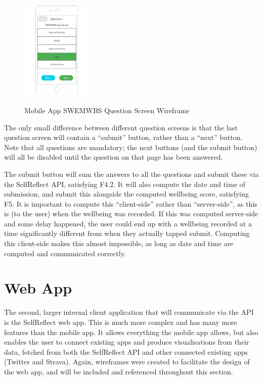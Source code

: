 \documentclass[11pt,openright,a4paper]{report}
\begin{document}
\begin{figure}[ht]
\centering
\caption{Mobile App SWEMWBS Question Screen Wireframe}
\includegraphics[width=0.3\textwidth]{i/mobilequestion.png}
\label{fig:mobilequestion}
\end{figure}

The only small difference between different question screens is that the last question screen will contain a \enquote{submit} button, rather than a \enquote{next} button. Note that all questions are mandatory; the next buttons (and the submit button) will all be disabled until the question on that page has been answered.

The submit button will sum the answers to all the questions and submit these via the SelfReflect API, satisfying F4.2. It will also compute the date and time of submission, and submit this alongside the computed wellbeing score, satisfying F5. It is important to compute this \enquote{client-side} rather than \enquote{server-side}, as this is (to the user) when the wellbeing was recorded. If this was computed server-side and some delay happened, the user could end up with a wellbeing recorded at a time significantly different from when they actually tapped submit. Computing this client-side makes this almost impossible, as long as date and time are computed and communicated correctly.

\section{Web App} \label{sec:webappdesign}
The second, larger internal client application that will communicate via the API is the SelfReflect web app. This is much more complex and has many more features than the mobile app. It allows everything the mobile app allows, but also enables the user to connect existing apps and produce visualisations from their data, fetched from both the SelfReflect API and other connected existing apps (Twitter and Strava). Again, wireframes were created to facilitate the design of the web app, and will be included and referenced throughout this section.
\end{document}
